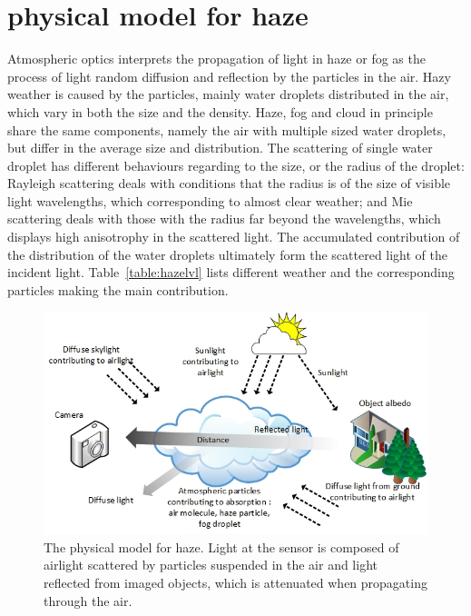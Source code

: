 \section{physical model for haze}
\label{sec:3.2.model}
Atmospheric optics interprets the propagation of light in haze or fog as the process of light random diffusion and reflection by the particles in the air. Hazy weather is caused by the particles, mainly water droplets distributed in the air, which vary in both the size and the density. Haze, fog and cloud in principle share the same components, namely the air with multiple sized water droplets, but differ in the average size and distribution. The scattering of single water droplet has different behaviours regarding to the size, or the radius of the droplet: Rayleigh scattering deals with conditions that the radius is of the size of visible light wavelengths, which corresponding to almost clear weather; and Mie scattering deals with those with the radius far beyond the wavelengths, which displays high anisotrophy in the scattered light. The accumulated contribution of the distribution of the water droplets ultimately form the scattered light of the incident light. Table~\ref{table:hazelvl} lists different weather and the corresponding particles making the main contribution.
\begin{figure}[t]
\centering
\centerline{\includegraphics[width=0.95\columnwidth]{hazerd/physical_model.jpg}}
\caption{The physical model for haze. Light at the sensor is composed of airlight scattered by particles suspended in the air and light reflected from imaged objects, which is attenuated when propagating through the air.}
\label{fig:3.2.physical}
\end{figure}

